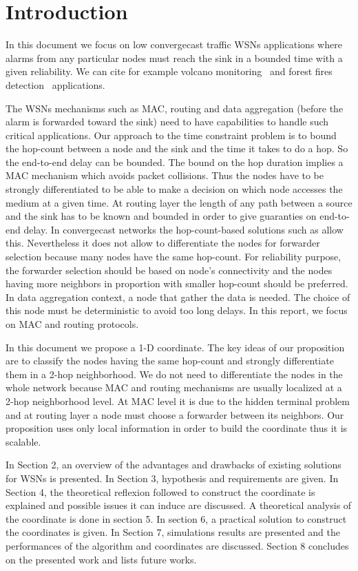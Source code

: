 \documentclass[a4paper]{article}
\begin{document}
\makeRR   


\section{Introduction}


In this document we focus on low convergecast traffic WSNs applications where alarms from any particular nodes must reach the sink in a bounded time with a given reliability. We can cite for example volcano monitoring~\cite{Tan10} and forest fires detection~\cite{Zhang08} applications.

The WSNs mechanisms such as MAC, routing and data aggregation (before the alarm is forwarded toward the sink) need to have capabilities to handle such critical applications. Our approach to the time constraint problem is to bound the hop-count between a node and the sink and the time it takes to do a hop. So the end-to-end delay can be bounded. The bound on the hop duration implies a MAC mechanism which avoids packet collisions. Thus the nodes have to be strongly differentiated to be able to make a decision on which node accesses the medium at a given time. At routing layer the length of any path between a source and the sink has to be known and bounded in order to give guaranties on end-to-end delay. In convergecast networks the hop-count-based solutions such as \cite{Ye05} allow this. Nevertheless it does not allow to differentiate the nodes for forwarder selection because many nodes have the same hop-count. For reliability purpose, the forwarder selection should be based on node's connectivity and the nodes having more neighbors in proportion with smaller hop-count should be preferred. In data aggregation context, a node that gather the data is needed. The choice of this node must be deterministic to avoid too long delays. In this report, we focus on MAC and routing protocols.

In this document we propose a 1-D coordinate. The key ideas of our proposition are to classify the nodes having the same hop-count and strongly differentiate them in a 2-hop neighborhood. We do not need to differentiate the nodes in the whole network because MAC and routing mechanisms are usually localized at a 2-hop neighborhood level. At MAC level it is due to the hidden terminal problem and at routing layer a node must choose a forwarder between its neighbors. Our proposition uses only local information in order to build the coordinate thus it is scalable.

In Section 2, an overview of the advantages and drawbacks of existing solutions for WSNs is presented. In Section 3, hypothesis and requirements are given. In Section 4, the theoretical reflexion followed to construct the coordinate is explained and possible issues it can induce are discussed. A theoretical analysis of the coordinate is done in section 5. In section 6, a practical solution to construct the coordinates is given. In Section 7, simulations results are presented and the performances of the algorithm and coordinates are discussed. Section 8 concludes on the presented work and lists future works.
\end{document}
